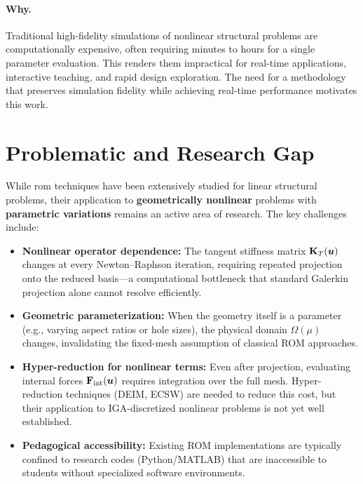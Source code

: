 \paragraph{Why.} Traditional high-fidelity simulations of nonlinear structural problems are computationally expensive, often requiring minutes to hours for a single parameter evaluation. This renders them impractical for real-time applications, interactive teaching, and rapid design exploration. The need for a methodology that preserves simulation fidelity while achieving real-time performance motivates this work.

\section*{Problematic and Research Gap}

While \acrlong{rom} techniques have been extensively studied for linear structural problems, their application to \textbf{geometrically nonlinear} problems with \textbf{parametric variations} remains an active area of research. The key challenges include:

\begin{itemize}
    \item \textbf{Nonlinear operator dependence:} The tangent stiffness matrix $\mathbf{K}_T(\bm{u})$ changes at every Newton--Raphson iteration, requiring repeated projection onto the reduced basis---a computational bottleneck that standard Galerkin projection alone cannot resolve efficiently.
    
    \item \textbf{Geometric parameterization:} When the geometry itself is a parameter (e.g., varying aspect ratios or hole sizes), the physical domain $\Omega(\mu)$ changes, invalidating the fixed-mesh assumption of classical ROM approaches.
    
    \item \textbf{Hyper-reduction for nonlinear terms:} Even after projection, evaluating internal forces $\mathbf{F}_{\text{int}}(\bm{u})$ requires integration over the full mesh. Hyper-reduction techniques (DEIM, ECSW) are needed to reduce this cost, but their application to IGA-discretized nonlinear problems is not yet well established.
    
    \item \textbf{Pedagogical accessibility:} Existing ROM implementations are typically confined to research codes (Python/MATLAB) that are inaccessible to students without specialized software environments.
\end{itemize}

